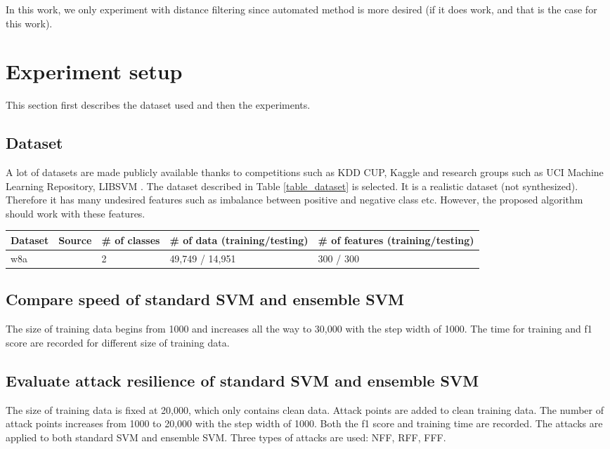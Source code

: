 \documentclass[10pt,conference,compsocconf,letterpaper]{IEEEtran}
\begin{document}
In this work, we only experiment with distance filtering since automated method is more desired (if it does work, and that is the case for this work). 



\section{Experiment setup}

This section first describes the dataset used and then the experiments.

\subsection{Dataset}
A lot of datasets are made publicly available thanks to competitions such as KDD CUP, Kaggle and research groups such as UCI Machine Learning Repository, LIBSVM \cite{kddcup,kaggle,uci,libsvm}. The dataset described in Table \ref{table_dataset} is selected. It is a realistic dataset (not synthesized). Therefore it has many undesired features such as imbalance between positive and negative class etc. However, the proposed algorithm should work with these features.

\begin{table*}[t]
\label{table_dataset}
\caption{Description of dataset}
\centering
\begin{tabular}{|l|l|l|l|l|}
\hline
Dataset&Source & \# of classes & \# of data (training/testing) & \# of features (training/testing) \\
\hline
w8a&\cite{jp98} & 2 & 49,749 / 14,951 & 300 / 300 \\
\hline
\end{tabular}
\end{table*}

\subsection{Compare speed of standard SVM and ensemble SVM}
The size of training data begins from 1000 and increases all the way to 30,000 with the step width of 1000. The time for training and f1 score are recorded for different size of training data.
\subsection{Evaluate attack resilience of standard SVM and ensemble SVM}
The size of training data is fixed at 20,000, which only contains clean data. Attack points are added to clean training data. The number of attack points increases from 1000 to 20,000 with the step width of 1000. Both the f1 score and training time are recorded. The attacks are applied to both standard SVM and ensemble SVM. Three types of attacks are used: NFF, RFF, FFF.
\end{document}
